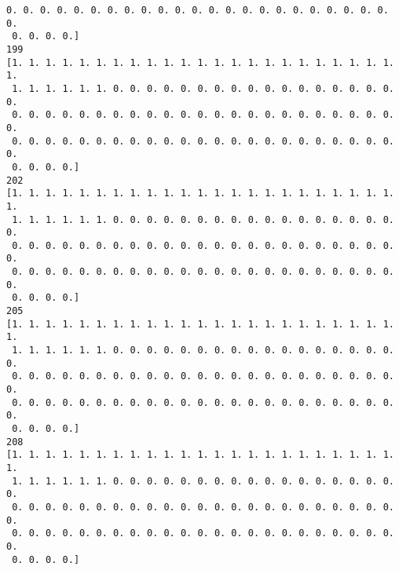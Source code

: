 \documentclass[11pt]{article}
\begin{document}
\begin{Verbatim}[commandchars=\\\{\}]
 0. 0. 0. 0. 0. 0. 0. 0. 0. 0. 0. 0. 0. 0. 0. 0. 0. 0. 0. 0. 0. 0. 0. 0.
 0. 0. 0. 0.]
199
[1. 1. 1. 1. 1. 1. 1. 1. 1. 1. 1. 1. 1. 1. 1. 1. 1. 1. 1. 1. 1. 1. 1. 1.
 1. 1. 1. 1. 1. 1. 0. 0. 0. 0. 0. 0. 0. 0. 0. 0. 0. 0. 0. 0. 0. 0. 0. 0.
 0. 0. 0. 0. 0. 0. 0. 0. 0. 0. 0. 0. 0. 0. 0. 0. 0. 0. 0. 0. 0. 0. 0. 0.
 0. 0. 0. 0. 0. 0. 0. 0. 0. 0. 0. 0. 0. 0. 0. 0. 0. 0. 0. 0. 0. 0. 0. 0.
 0. 0. 0. 0.]
202
[1. 1. 1. 1. 1. 1. 1. 1. 1. 1. 1. 1. 1. 1. 1. 1. 1. 1. 1. 1. 1. 1. 1. 1.
 1. 1. 1. 1. 1. 1. 0. 0. 0. 0. 0. 0. 0. 0. 0. 0. 0. 0. 0. 0. 0. 0. 0. 0.
 0. 0. 0. 0. 0. 0. 0. 0. 0. 0. 0. 0. 0. 0. 0. 0. 0. 0. 0. 0. 0. 0. 0. 0.
 0. 0. 0. 0. 0. 0. 0. 0. 0. 0. 0. 0. 0. 0. 0. 0. 0. 0. 0. 0. 0. 0. 0. 0.
 0. 0. 0. 0.]
205
[1. 1. 1. 1. 1. 1. 1. 1. 1. 1. 1. 1. 1. 1. 1. 1. 1. 1. 1. 1. 1. 1. 1. 1.
 1. 1. 1. 1. 1. 1. 0. 0. 0. 0. 0. 0. 0. 0. 0. 0. 0. 0. 0. 0. 0. 0. 0. 0.
 0. 0. 0. 0. 0. 0. 0. 0. 0. 0. 0. 0. 0. 0. 0. 0. 0. 0. 0. 0. 0. 0. 0. 0.
 0. 0. 0. 0. 0. 0. 0. 0. 0. 0. 0. 0. 0. 0. 0. 0. 0. 0. 0. 0. 0. 0. 0. 0.
 0. 0. 0. 0.]
208
[1. 1. 1. 1. 1. 1. 1. 1. 1. 1. 1. 1. 1. 1. 1. 1. 1. 1. 1. 1. 1. 1. 1. 1.
 1. 1. 1. 1. 1. 1. 0. 0. 0. 0. 0. 0. 0. 0. 0. 0. 0. 0. 0. 0. 0. 0. 0. 0.
 0. 0. 0. 0. 0. 0. 0. 0. 0. 0. 0. 0. 0. 0. 0. 0. 0. 0. 0. 0. 0. 0. 0. 0.
 0. 0. 0. 0. 0. 0. 0. 0. 0. 0. 0. 0. 0. 0. 0. 0. 0. 0. 0. 0. 0. 0. 0. 0.
 0. 0. 0. 0.]

    \end{Verbatim}
\end{document}
